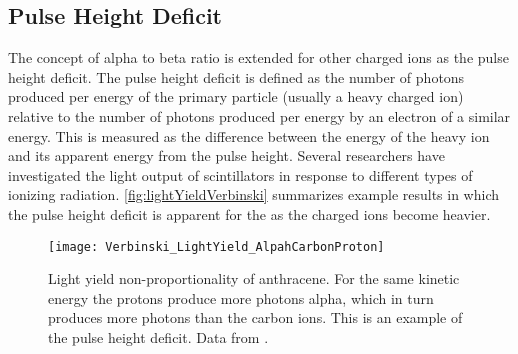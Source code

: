 \subsection{Pulse Height Deficit}
\label{sec:PulseHeightDeficit}
The concept of alpha to beta ratio is extended for other charged ions as the pulse height deficit.
The pulse height deficit is defined as the number of photons produced per energy of the primary particle (usually a heavy charged ion) relative to the number of photons produced per energy by an electron of a similar energy.
This is measured as the difference between the energy of the heavy ion and its apparent energy from the pulse height.  
Several researchers have investigated the light output of scintillators in response to different types of ionizing radiation\cite{Verbinski_1968}.
\autoref{fig:lightYieldVerbinski} summarizes example results in which the pulse height deficit is apparent for the as the charged ions become heavier.
\begin{figure}
  \centering
  \texttt{[image: Verbinski\_LightYield\_AlpahCarbonProton]}
  \caption[Light yield non-proportionality of anthracene]{Light yield non-proportionality of anthracene. For the same kinetic energy the protons produce more photons alpha, which in turn produces more photons than the  carbon ions. This is an example of the pulse height deficit. Data from \cite{Verbinski_1968}.}
  \label{fig:lightYieldVerbinski}
\end{figure}

